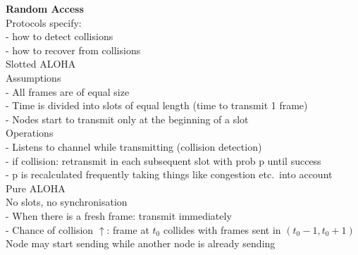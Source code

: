\documentclass[10pt, a4paper]{article}
\newcommand{\blue}[1]{{\color{MidnightBlue}#1}}
\newcommand{\red}[1]{{\color{red}#1}}
\begin{document}
\begin{multicols*}{3}
		\textbf{Random Access}\\
		Protocols specify:\\
		- how to detect collisions\\
		- how to recover from collisions\\
		Slotted ALOHA\\
		\blue{Assumptions}\\
		- All frames are of equal size\\
		- Time is divided into slots of equal length (time to transmit 1 frame)\\
		- Nodes start to transmit only at the beginning of a slot\\
		\blue{Operations}\\
		- Listens to channel while transmitting (collision detection)\\
		- \red{if collision:} \blue{retransmit} in each \blue{subsequent slot} with prob \red{p} until success\\
		- \red{p} is recalculated frequently taking things like congestion etc.\ into account \\
		Pure ALOHA\\
		No slots, no synchronisation\\
		- When there is a fresh frame: transmit immediately\\
		- Chance of collision $\uparrow$: frame at $t_{0}$ collides with frames sent in $(t_{0}-1, t_{0} + 1)$\\
		Node may start sending while another node is already sending\\


\end{multicols*}
\end{document}
